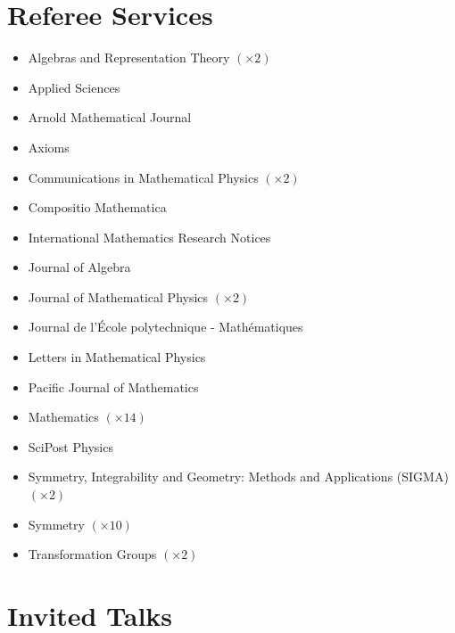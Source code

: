\documentclass[11pt,letterpaper,roman%
]{moderncv}
\begin{document}
\section{Referee Services}
\begin{itemize}[parsep=-0.2em, leftmargin=3.55cm]
    \item Algebras and Representation Theory $(\times 2)$
    \item Applied Sciences
    \item Arnold Mathematical Journal
    \item Axioms
    \item Communications in Mathematical Physics $(\times 2)$
    \item Compositio Mathematica
    \item International Mathematics Research Notices
    \item Journal of Algebra
    \item Journal of Mathematical Physics $(\times 2)$
    \item Journal de l'École polytechnique - Mathématiques
    \item Letters in Mathematical Physics
    \item Pacific Journal of Mathematics
    \item Mathematics $(\times 14)$
    \item SciPost Physics
    \item Symmetry, Integrability and Geometry: Methods and Applications (SIGMA) $(\times 2)$
    \item Symmetry $(\times 10)$
    \item Transformation Groups $(\times 2)$
\end{itemize}



\section{Invited Talks}
\end{document}
